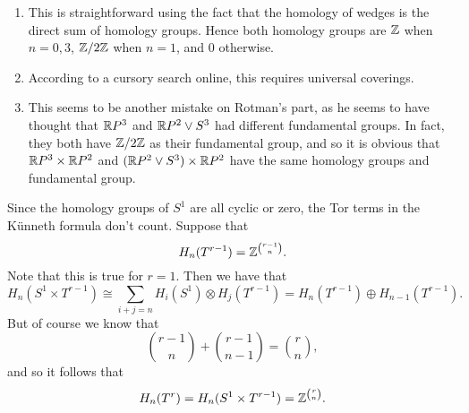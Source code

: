 \documentclass[../../solutions.tex]{subfiles}
\begin{document}
\begin{exercise} \leavevmode
\begin{enumerate}
\item
This is straightforward using the fact that the homology of wedges is the direct sum of homology groups.
Hence both homology groups are $\mathbb{Z}$ when $n=0,3$, $\mathbb{Z}/2\mathbb{Z}$ when $n=1$, and 0 otherwise.

\item
According to a cursory search online, this requires universal coverings.

\item
This seems to be another mistake on Rotman's part, as he seems to have thought that $\mathbb{R} P^3$ and $\mathbb{R} P^2\vee S^3$ had different fundamental groups.
In fact, they both have $\mathbb{Z}/2\mathbb{Z}$ as their fundamental group, and so it is obvious that $\mathbb{R} P^3\times\mathbb{R} P^2$ and $(\mathbb{R} P^2\vee S^3)\times\mathbb{R} P^2$ have the same homology groups and fundamental group.
\end{enumerate}
\end{exercise}

\begin{exercise} \leavevmode
Since the homology groups of $S^1$ are all cyclic or zero, the Tor terms in the K\"unneth formula don't count.
Suppose that
\[H_n(T^{r-1})=\mathbb{Z}^{\binom{r-1}n}.\]
Note that this is true for $r=1$.
Then we have that
\[H_n(S^1\times T^{r-1})\cong\sum_{i+j=n}H_i(S^1)\otimes H_j(T^{r-1})=H_n(T^{r-1})\oplus H_{n-1}(T^{r-1}).\]
But of course we know that
\[\binom{r-1}{n}+\binom{r-1}{n-1}=\binom rn,\]
and so it follows that
\[H_n(T^r)=H_n(S^1\times T^{r-1})=\mathbb{Z}^{\binom rn}.\]
\end{exercise}
\end{document}
